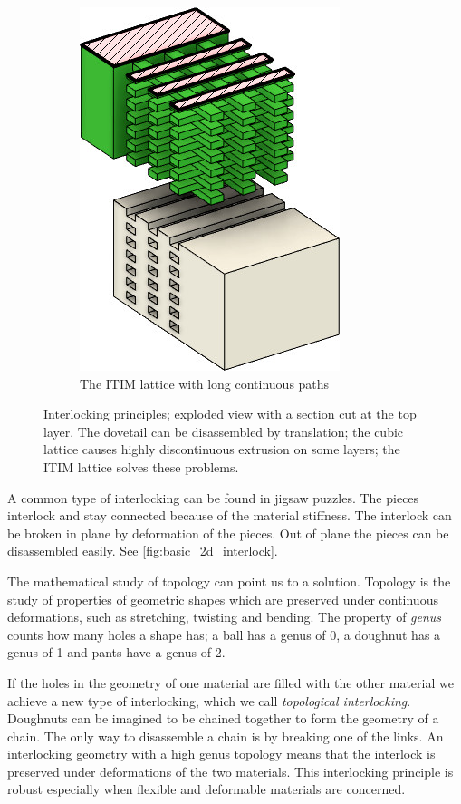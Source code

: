 \begin{figure}
\begin{subfigure}[B]{.36\columnwidth}
		\includegraphics[height=\figheight]{sources/method/basic_lattice.jpg}
		\caption{The ITIM lattice with long continuous paths}
		\label{fig:basic_structure_single_mat}
	\end{subfigure}
	\caption{Interlocking principles; exploded view with a section cut at the top layer. The dovetail can be disassembled by translation; the cubic lattice causes highly discontinuous extrusion on some layers; the ITIM lattice solves these problems.}
	\label{fig:basic_structure}
\end{figure}






A common type of interlocking can be found in jigsaw puzzles.
The pieces interlock and stay connected because of the material stiffness.
The interlock can be broken in plane by deformation of the pieces.
Out of plane the pieces can be disassembled easily.
See \cref{fig:basic_2d_interlock}.

The mathematical study of topology can point us to a solution.
Topology is the study of properties of geometric shapes which are preserved under continuous deformations, such as stretching, twisting and bending.
The property of \emph{genus} counts how many holes a shape has;
a ball has a genus of 0, a doughnut has a genus of 1 and pants have a genus of 2.

If the holes in the geometry of one material are filled with the other material we achieve a new type of interlocking, which we call \emph{topological interlocking}.
Doughnuts can be imagined to be chained together to form the geometry of a chain.
The only way to disassemble a chain is by breaking one of the links.
An interlocking geometry with a high genus topology means that the interlock is preserved under deformations of the two materials.
This interlocking principle is robust especially when flexible and deformable materials are concerned.

